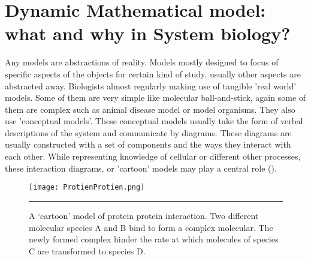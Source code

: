 \section{Dynamic Mathematical model: what and why in System biology?}
Any models are abstractions of reality. Models mostly designed to focus of specific aspects of the objects for
certain kind of study. usually other aspects are abstracted away. Biologists almost regularly making use of tangible
'real world' models. Some of them are very simple like molecular ball-and-stick, again some of them are complex
such as animal disease model or model organisms. They also use 'conceptual models'. These conceptual models
usually take the form of verbal descriptions of the system and communicate by diagrams. These diagrams are
usually constructed with a set of components and the ways they interact with each other. While representing 
knowledge of cellular or different other processes, these interaction diagrams, or 'cartoon' models may play a 
central role (\cite{Ingalls:2012}).

\begin{figure}%
	\centering
		\texttt{[image: ProtienProtien.png]}
		\rule{35em}{0.5pt}
	\caption[A ‘cartoon’ model of protein protein interaction.]{A ‘cartoon’ model of protein protein interaction. Two different molecular species A and B bind to
		 form a complex molecular. The newly formed complex hinder the rate at which molecules of species 
		 C are transformed to species D.}
	\label{fig:Protein protein interaction}
\end{figure}

